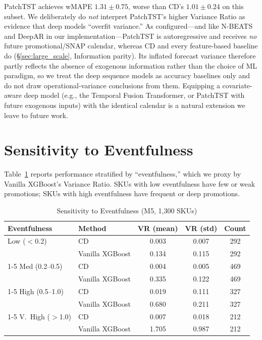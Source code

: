 \documentclass[10pt]{article} %
\theoremstyle{plain}
\theoremstyle{definition}
\begin{document}
PatchTST achieves wMAPE $1.31 \pm 0.75$, worse than CD's $1.01 \pm 0.24$ on this subset. We deliberately do \emph{not} interpret PatchTST's higher Variance Ratio as evidence that deep models ``overfit variance.'' As configured---and like N-BEATS and DeepAR in our implementation---PatchTST is autoregressive and receives \emph{no} future promotional/SNAP calendar, whereas CD and every feature-based baseline do (\S\ref{sec:large_scale}, Information parity). Its inflated forecast variance therefore partly reflects the absence of exogenous information rather than the choice of ML paradigm, so we treat the deep sequence models as accuracy baselines only and do not draw operational-variance conclusions from them. Equipping a covariate-aware deep model (e.g., the Temporal Fusion Transformer, or PatchTST with future exogenous inputs) with the identical calendar is a natural extension we leave to future work.

\section{Sensitivity to Eventfulness}
\label{app:eventfulness}

Table~\ref{tab:sensitivity} reports performance stratified by ``eventfulness,'' which we proxy by Vanilla XGBoost's Variance Ratio. SKUs with low eventfulness have few or weak promotions; SKUs with high eventfulness have frequent or deep promotions.

\begin{table}[ht]
\centering
\footnotesize
\setlength{\tabcolsep}{3pt}
\caption{Sensitivity to Eventfulness (M5, 1{,}300 SKUs)}
\label{tab:sensitivity}
\begin{tabular}{@{}llccc@{}}
\toprule
Eventfulness & Method & VR (mean) & VR (std) & Count \\
\midrule
Low ($<$0.2) & CD & 0.003 & 0.007 & 292 \\
             & Vanilla XGBoost & 0.134 & 0.115 & 292 \\
\cmidrule(lr){1-5}
Med (0.2--0.5) & CD & 0.004 & 0.005 & 469 \\
             & Vanilla XGBoost & 0.335 & 0.122 & 469 \\
\cmidrule(lr){1-5}
High (0.5--1.0) & CD & 0.019 & 0.111 & 327 \\
             & Vanilla XGBoost & 0.680 & 0.211 & 327 \\
\cmidrule(lr){1-5}
V.~High ($>$1.0) & CD & 0.007 & 0.018 & 212 \\
             & Vanilla XGBoost & 1.705 & 0.987 & 212 \\
\bottomrule
\end{tabular}
\end{table}
\end{document}
